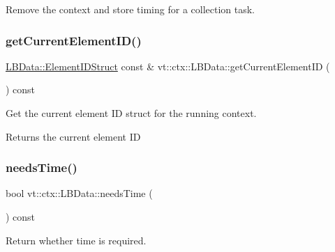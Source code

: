 Remove the context and store timing for a collection task. 

\mbox{\label{structvt_1_1ctx_1_1_l_b_data_ac2f63d7854e0c1d4c1c2b9ddf200f8c6}} 
\subsubsection{\texorpdfstring{get\+Current\+Element\+I\+D()}{getCurrentElementID()}}
{\footnotesize\ttfamily \hyperlink{structvt_1_1ctx_1_1_l_b_data_aad9fac05c3faf80173b273d900db6fb1}{L\+B\+Data\+::\+Element\+I\+D\+Struct} const  \& vt\+::ctx\+::\+L\+B\+Data\+::get\+Current\+Element\+ID (\begin{DoxyParamCaption}{ }\end{DoxyParamCaption}) const}



Get the current element ID struct for the running context. 

\begin{DoxyReturn}{Returns}
the current element ID 
\end{DoxyReturn}
\mbox{\label{structvt_1_1ctx_1_1_l_b_data_ae4a5cbc3f4f0d9aedf635ee57039a44d}} 
\subsubsection{\texorpdfstring{needs\+Time()}{needsTime()}}
{\footnotesize\ttfamily bool vt\+::ctx\+::\+L\+B\+Data\+::needs\+Time (\begin{DoxyParamCaption}{ }\end{DoxyParamCaption}) const\hspace{0.3cm}{\ttfamily [inline]}}



Return whether time is required. 

\mbox{\label{structvt_1_1ctx_1_1_l_b_data_ae398bd79d3e4fc5b865097306e696ac2}} 
